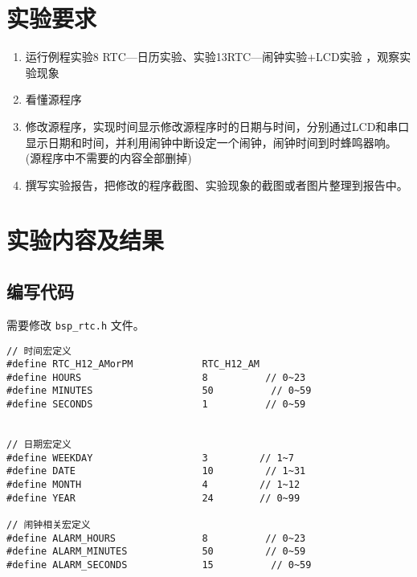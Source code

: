 \documentclass{math201}
\begin{document}

\makecover


\section{实验要求}

\begin{enumerate}
  \item 运行例程实验8 RTC—日历实验、实验13RTC—闹钟实验+LCD实验 ，观察实验现象
  \item 看懂源程序
  \item 修改源程序，实现时间显示修改源程序时的日期与时间，分别通过LCD和串口显示日期和时间，并利用闹钟中断设定一个闹钟，闹钟时间到时蜂鸣器响。 (源程序中不需要的内容全部删掉)
  \item 撰写实验报告，把修改的程序截图、实验现象的截图或者图片整理到报告中。
\end{enumerate}

\section{实验内容及结果}

\subsection{编写代码}

需要修改 \texttt{bsp\_rtc.h} 文件。

\begin{verbatim}
// 时间宏定义
#define RTC_H12_AMorPM            RTC_H12_AM  
#define HOURS                     8          // 0~23
#define MINUTES                   50          // 0~59
#define SECONDS                   1          // 0~59


// 日期宏定义
#define WEEKDAY                   3         // 1~7
#define DATE                      10         // 1~31
#define MONTH                     4         // 1~12
#define YEAR                      24        // 0~99

// 闹钟相关宏定义
#define ALARM_HOURS               8          // 0~23
#define ALARM_MINUTES             50         // 0~59
#define ALARM_SECONDS             15          // 0~59
\end{verbatim}
\end{document}
